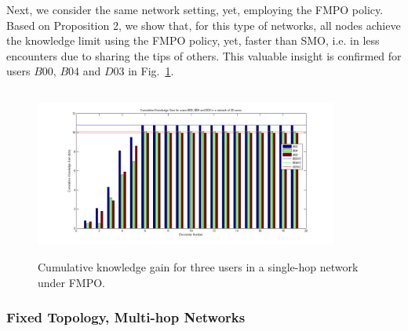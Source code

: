 \documentclass[12pt,epsf]{article}
\theoremstyle{definition}
\begin{document}
Next, we consider the same network setting, yet, employing the FMPO policy.
Based on Proposition 2, we show that, for this type of networks, all nodes achieve the knowledge limit using the FMPO policy, yet, faster than SMO, i.e. in less encounters due to sharing the tips of others. This valuable insight is confirmed for users $B00$, $B04$ and $D03$ in Fig.~\ref{fig:B00_SSHOP(MO)}.
%
\begin{figure}[!bp]
\centering
    \includegraphics[width=10cm ,height=5.6cm]{figures_png/Fig6}
    \caption{Cumulative knowledge gain for three users in a single-hop network under FMPO.}\label{fig:B00_SSHOP(MO)}
\end{figure}
\vspace{-0.4 cm}
\subsubsection{Fixed Topology, Multi-hop Networks}
\vspace{-0.2 cm}
\end{document}
